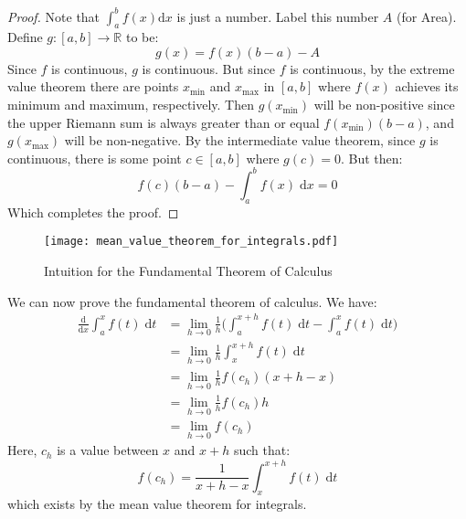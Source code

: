 \documentclass{article}
\theoremstyle{plain}
\begin{document}
    \begin{proof}
        Note that $\int_{a}^{b}f(x)\textrm{d}x$ is just a number. Label this
        number $A$ (for Area). Define $g:[a,b]\rightarrow\mathbb{R}$ to be:
        \begin{equation}
            g(x)=f(x)(b-a)-A
        \end{equation}
        Since $f$ is continuous, $g$ is continuous. But since $f$ is continuous,
        by the extreme value theorem there are points $x_{\textrm{min}}$ and
        $x_{\textrm{max}}$ in $[a,b]$ where $f(x)$ achieves its minimum and
        maximum, respectively. Then $g(x_{\textrm{min}})$ will be
        non-positive since the upper Riemann sum is always greater than or
        equal $f(x_{\textrm{min}})(b-a)$, and $g(x_{\textrm{max}})$ will be
        non-negative. By the intermediate value theorem, since $g$ is
        continuous, there is some point $c\in[a,b]$ where $g(c)=0$. But then:
        \begin{equation}
            f(c)(b-a)-\int_{a}^{b}f(x)\;\textrm{d}x=0
        \end{equation}
        Which completes the proof.
    \end{proof}
    \begin{figure}
        \centering
        \texttt{[image: mean\_value\_theorem\_for\_integrals.pdf]}
        \caption{Intuition for the Fundamental Theorem of Calculus}
    \end{figure}
    We can now prove the fundamental theorem of calculus. We have:
    \begin{align}
        \frac{\textrm{d}}{\textrm{d}x}\int_{a}^{x}f(t)\;\textrm{d}t
            &=\lim_{h\rightarrow{0}}\frac{1}{h}\Big(
                \int_{a}^{x+h}f(t)\;\textrm{d}t-
                \int_{a}^{x}f(t)\;\textrm{d}t\Big)\\
            &=\lim_{h\rightarrow{0}}\frac{1}{h}
                \int_{x}^{x+h}f(t)\;\textrm{d}t\\
            &=\lim_{h\rightarrow{0}}\frac{1}{h}f(c_{h})(x+h-x)\\
            &=\lim_{h\rightarrow{0}}\frac{1}{h}f(c_{h})h\\
            &=\lim_{h\rightarrow{0}}f(c_{h})
    \end{align}
    Here, $c_{h}$ is a value between $x$ and $x+h$ such that:
    \begin{equation}
        f(c_{h})=\frac{1}{x+h-x}\int_{x}^{x+h}f(t)\;\textrm{d}t
    \end{equation}
    which exists by the mean value theorem for integrals.
\end{document}
